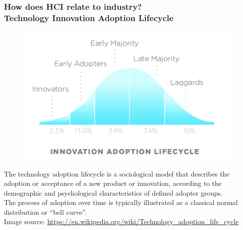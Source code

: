 \documentclass[screen, aspectratio=169]{beamer}
\begin{document}
%
\begin{frame}[shrink=20]
\frametitle{How does HCI relate to industry?\\ Technology Innovation Adoption Lifecycle}
\begin{figure}
\includegraphics[scale=0.45]{img/DiffusionOfInnovation.png}
\end{figure}
The technology adoption lifecycle is a sociological model that describes the adoption or acceptance of a new product or innovation, according to the demographic and psychological characteristics of defined adopter groups. \\
The process of adoption over time is typically illustrated as a classical normal distribution or ``bell curve''.  \cite{Rogers.1983.diffusion}\\
{\scriptsize Image source: \url{https://en.wikipedia.org/wiki/Technology_adoption_life_cycle}}
\end{frame}
\end{document}
